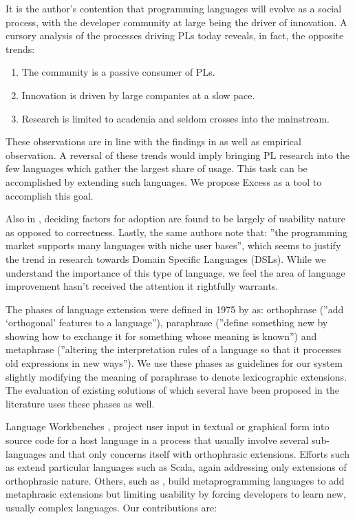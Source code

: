 \documentclass[conference]{IEEEtran}
\begin{document}
It is the author's contention that programming languages will evolve as a social process, with the developer community at large being the driver of innovation. A cursory analysis of the processes driving PLs today reveals, in fact, 
the opposite trends: 

\begin{enumerate}
   \item The community is a passive consumer of PLs.
   \item Innovation is driven by large companies at a slow pace.
   \item Research is limited to academia and seldom crosses into the mainstream.
 \end{enumerate}

These observations are in line with the findings in \cite{Meyerovich} as well as empirical observation. A reversal of these trends would imply 
bringing PL research into the few languages which gather the largest share of usage. This task can be accomplished by extending such languages. We propose Excess as a tool to accomplish this goal.

Also in \cite{Meyerovich}, deciding factors for adoption are found to be largely of usability nature as opposed to correctness. Lastly, the same authors note that: 
''the programming market supports many languages with niche user bases'', which seems to justify the trend in research towards Domain Specific Languages (DSLs). 
While we understand the importance of this type of language, we feel the area of language improvement hasn't received the attention it rightfully warrants.

The phases of language extension were defined in 1975 by \cite{Standish} as: orthophrase (''add `orthogonal' features to a language''), paraphrase (''define something new by showing how to exchange it 
for something whose meaning is known'') and metaphrase (''altering the interpretation rules of a language so that it processes old expressions in new ways''). We use these phases as guidelines 
for our system slightly modifying the meaning of paraphrase to denote lexicographic extensions. The evaluation of existing solutions of which several have been proposed in the literature uses these phases as well. 
 
Language Workbenches \cite{Fowler}, project user input in textual or graphical form into source code for a host language in a process that usually involve several sub-languages and that only concerns itself with orthophrasic extensions. 
Efforts such as \cite{Brown} extend particular languages such as Scala, again addressing only extensions of orthophrasic nature. 
Others, such as \cite{Rascal, Stratego}, build metaprogramming languages to add metaphrasic extensions but limiting usability by forcing developers to learn new, usually complex languages. Our contributions are:
\end{document}
